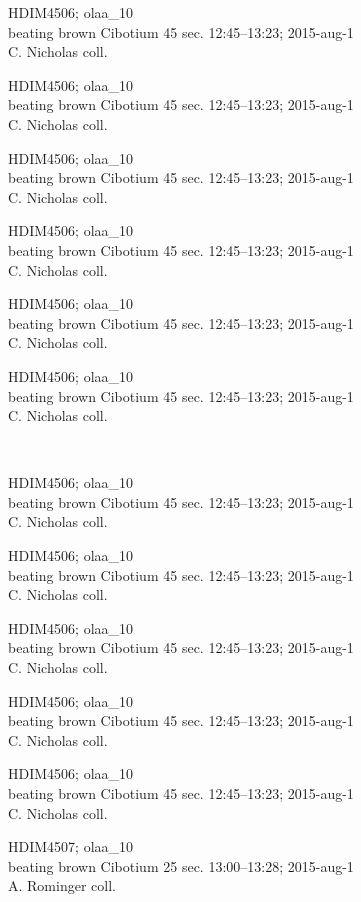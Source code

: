 \documentclass[2pt]{extarticle}
\begin{document}
\noindent
\parbox{0.16\textwidth}{\tiny \raggedright \rule[-0.3\baselineskip]{0pt}{10pt}HDIM4506; olaa\_10\\ beating brown Cibotium 45 sec. 12:45--13:23; 2015-aug-1\\ C. Nicholas coll.}
\parbox{0.16\textwidth}{\tiny \raggedright \rule[-0.3\baselineskip]{0pt}{10pt}HDIM4506; olaa\_10\\ beating brown Cibotium 45 sec. 12:45--13:23; 2015-aug-1\\ C. Nicholas coll.}
\parbox{0.16\textwidth}{\tiny \raggedright \rule[-0.3\baselineskip]{0pt}{10pt}HDIM4506; olaa\_10\\ beating brown Cibotium 45 sec. 12:45--13:23; 2015-aug-1\\ C. Nicholas coll.}
\parbox{0.16\textwidth}{\tiny \raggedright \rule[-0.3\baselineskip]{0pt}{10pt}HDIM4506; olaa\_10\\ beating brown Cibotium 45 sec. 12:45--13:23; 2015-aug-1\\ C. Nicholas coll.}
\parbox{0.16\textwidth}{\tiny \raggedright \rule[-0.3\baselineskip]{0pt}{10pt}HDIM4506; olaa\_10\\ beating brown Cibotium 45 sec. 12:45--13:23; 2015-aug-1\\ C. Nicholas coll.}
\parbox{0.16\textwidth}{\tiny \raggedright \rule[-0.3\baselineskip]{0pt}{10pt}HDIM4506; olaa\_10\\ beating brown Cibotium 45 sec. 12:45--13:23; 2015-aug-1\\ C. Nicholas coll.} \\ 
\vspace{0.001in} 

\noindent
\parbox{0.16\textwidth}{\tiny \raggedright \rule[-0.3\baselineskip]{0pt}{10pt}HDIM4506; olaa\_10\\ beating brown Cibotium 45 sec. 12:45--13:23; 2015-aug-1\\ C. Nicholas coll.}
\parbox{0.16\textwidth}{\tiny \raggedright \rule[-0.3\baselineskip]{0pt}{10pt}HDIM4506; olaa\_10\\ beating brown Cibotium 45 sec. 12:45--13:23; 2015-aug-1\\ C. Nicholas coll.}
\parbox{0.16\textwidth}{\tiny \raggedright \rule[-0.3\baselineskip]{0pt}{10pt}HDIM4506; olaa\_10\\ beating brown Cibotium 45 sec. 12:45--13:23; 2015-aug-1\\ C. Nicholas coll.}
\parbox{0.16\textwidth}{\tiny \raggedright \rule[-0.3\baselineskip]{0pt}{10pt}HDIM4506; olaa\_10\\ beating brown Cibotium 45 sec. 12:45--13:23; 2015-aug-1\\ C. Nicholas coll.}
\parbox{0.16\textwidth}{\tiny \raggedright \rule[-0.3\baselineskip]{0pt}{10pt}HDIM4506; olaa\_10\\ beating brown Cibotium 45 sec. 12:45--13:23; 2015-aug-1\\ C. Nicholas coll.}
\parbox{0.16\textwidth}{\tiny \raggedright \rule[-0.3\baselineskip]{0pt}{10pt}HDIM4507; olaa\_10\\ beating brown Cibotium 25 sec. 13:00--13:28; 2015-aug-1\\ A. Rominger coll.} \\ 
\vspace{0.001in} 
\end{document}
